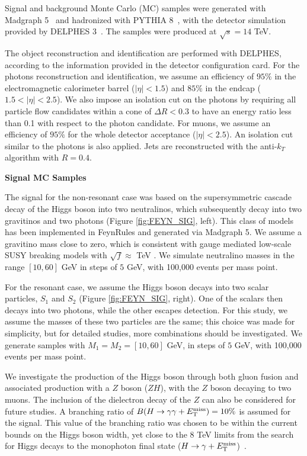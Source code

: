 Signal and background Monte Carlo (MC) samples were generated with Madgraph 5~\cite{madgraph} and hadronized with PYTHIA 8~\cite{pythia}, with the detector simulation provided by DELPHES 3~\cite{delphes}.
The samples were produced at $\sqrt{s} = 14$ TeV.

The object reconstruction and identification are performed with DELPHES, according to the information provided in the detector configuration card. For the photons reconstruction and identification, we assume an efficiency of $95\%$ in the electromagnetic calorimeter barrel ($|\eta| < 1.5$) and $85\%$ in the endcap ($1.5 < |\eta| < 2.5$). We also impose an isolation cut on the photons by requiring all particle flow candidates within a cone of $\Delta R < 0.3$ to have an energy ratio less than 0.1 with respect to the photon candidate. For muons, we assume an efficiency of $95\%$ for the whole detector acceptance ($|\eta| < 2.5$). An isolation cut similar to the photons is also applied. Jets are reconstructed with the anti-$k_T$ algorithm with $R = 0.4$.

\vspace{0.2cm} \textbf{Signal MC Samples}

The signal for the non-resonant case was based on the supersymmetric cascade decay of the Higgs boson into two neutralinos, which subsequently decay into two gravitinos and two photons (Figure \ref{fig:FEYN_SIG}, left). This class of models has been implemented in FeynRules \cite{Christensen:2013aua} and generated via Madgraph 5. We assume a gravitino mass close to zero, which is consistent with gauge mediated low-scale SUSY breaking models with $\sqrt{f} \approx$ TeV \cite{Petersson:2012dp}. We simulate neutralino masses in the range $[10,60]$ GeV in steps of $5$ GeV, with 100,000 events per mass point.

For the resonant case, we assume the Higgs boson decays into two scalar particles, $S_1$ and $S_2$ (Figure \ref{fig:FEYN_SIG}, right). One of the scalars then decays into two photons, while the other escapes detection. For this study, we assume the masses of these two particles are the same; this choice was made for simplicity, but for detailed studies, more combinations should be investigated. We generate samples with $M_{1} = M_{2} = [10,60]$ GeV, in steps of $5$ GeV, with 100,000 events per mass point.

We investigate the production of the Higgs boson through both gluon fusion and associated production with a $Z$ boson ($ZH$), with the $Z$ boson decaying to two muons. The inclusion of the dielectron decay of the $Z$ can also be considered for future studies.
%
A branching ratio of ${B}(H\to\gamma\gamma+E_{\mathrm{T}}^{\text{miss}}) = 10\%$ is assumed for the signal. This value of the branching ratio was chosen to be within the current bounds on the Higgs boson width, yet close to the 8 TeV limits from the search for Higgs decays to the monophoton final state ($H\to\gamma+E_{\mathrm{T}}^{\text{miss}}$)~\cite{lowmonophoton}.


